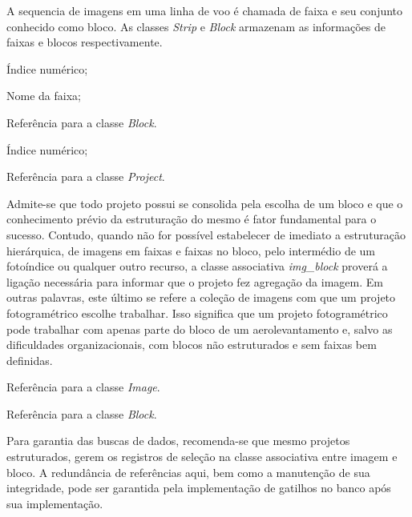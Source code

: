 A sequencia de imagens em uma linha de voo é chamada de faixa e seu conjunto conhecido como bloco. As classes \textit{Strip} e \textit{Block} armazenam as informações de faixas e blocos respectivamente.

\begin{description}[labelwidth=2cm, itemsep=-0.3cm]
\item [Classe Strip]
\item[Id:] Índice numérico;
\item[Name:] Nome da faixa;
\item[Id\_block:]  Referência para a classe \textit{Block}.
\end{description}

\begin{description}[labelwidth=2cm, itemsep=-0.3cm]
\item [Classe Block]
\item[Id:] Índice numérico;
\item[Id\_proj:]  Referência para a classe \textit{Project}.
\end{description}

Admite-se que todo projeto possui se consolida pela escolha de um bloco e que o conhecimento prévio da estruturação do mesmo é fator fundamental para o sucesso. Contudo, quando não for possível estabelecer de imediato a estruturação hierárquica, de imagens em faixas e faixas no bloco, pelo intermédio de um fotoíndice ou qualquer outro recurso, a classe associativa \textit{img\_block} proverá a ligação necessária para informar que o projeto fez agregação da imagem. Em outras palavras, este último se refere a coleção de imagens com que um projeto fotogramétrico escolhe trabalhar. Isso significa que um projeto fotogramétrico pode trabalhar com apenas parte do bloco de um aerolevantamento e, salvo as dificuldades organizacionais, com blocos não estruturados e sem faixas bem definidas.

\begin{description}[labelwidth=2cm, itemsep=-0.3cm]
\item [Classe Img\_block]
\item[Id\_img:]  Referência para a classe \textit{Image}.
\item[Id\_block:]  Referência para a classe \textit{Block}.
\end{description}

Para garantia das buscas de dados, recomenda-se que mesmo projetos estruturados, gerem os registros de seleção na classe associativa entre imagem e bloco. A redundância de referências aqui, bem como a manutenção de sua integridade, pode ser garantida pela implementação de gatilhos no banco após sua implementação.


